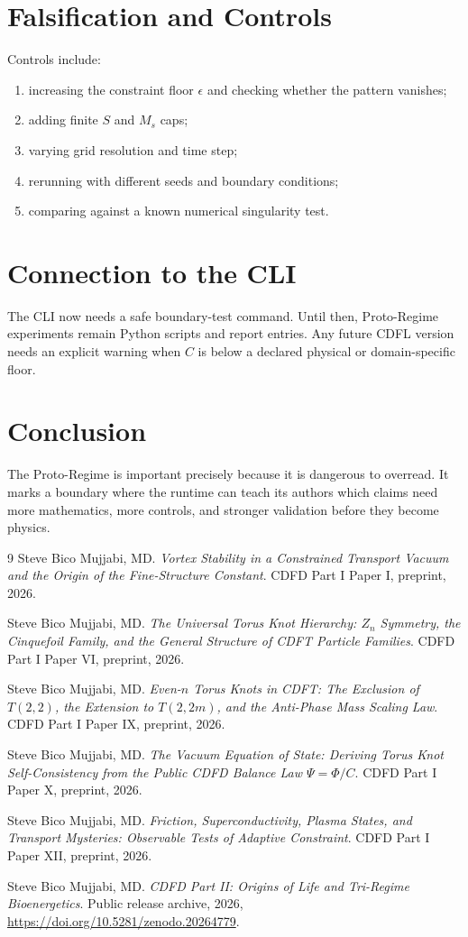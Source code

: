 \documentclass[12pt,a4paper]{article}
\begin{document}
\section{Falsification and Controls}
Controls include:
\begin{enumerate}
    \item increasing the constraint floor $\epsilon$ and checking whether the
    pattern vanishes;
    \item adding finite $S$ and $M_s$ caps;
    \item varying grid resolution and time step;
    \item rerunning with different seeds and boundary conditions;
    \item comparing against a known numerical singularity test.
\end{enumerate}

\section{Connection to the CLI}
The CLI now needs a safe boundary-test command. Until then,
Proto-Regime experiments remain Python scripts and report entries. Any future
CDFL version needs an explicit warning when $C$ is below a declared
physical or domain-specific floor.

\section{Conclusion}
The Proto-Regime is important precisely because it is dangerous to overread.
It marks a boundary where the runtime can teach its authors which claims need
more mathematics, more controls, and stronger validation before they become
physics.
\begin{thebibliography}{9}
Steve Bico Mujjabi, MD. \emph{Vortex Stability in a Constrained Transport Vacuum and the Origin of the Fine-Structure Constant}. CDFD Part I Paper I, preprint, 2026.

Steve Bico Mujjabi, MD. \emph{The Universal Torus Knot Hierarchy: $Z_n$ Symmetry, the Cinquefoil Family, and the General Structure of CDFT Particle Families}. CDFD Part I Paper VI, preprint, 2026.

Steve Bico Mujjabi, MD. \emph{Even-$n$ Torus Knots in CDFT: The Exclusion of $T(2,2)$, the Extension to $T(2,2m)$, and the Anti-Phase Mass Scaling Law}. CDFD Part I Paper IX, preprint, 2026.

Steve Bico Mujjabi, MD. \emph{The Vacuum Equation of State: Deriving Torus Knot Self-Consistency from the Public CDFD Balance Law $\Psi = \Phi/C$}. CDFD Part I Paper X, preprint, 2026.

Steve Bico Mujjabi, MD. \emph{Friction, Superconductivity, Plasma States, and Transport Mysteries: Observable Tests of Adaptive Constraint}. CDFD Part I Paper XII, preprint, 2026.

Steve Bico Mujjabi, MD. \emph{CDFD Part II: Origins of Life and Tri-Regime Bioenergetics}. Public release archive, 2026, \url{https://doi.org/10.5281/zenodo.20264779}.
\end{thebibliography}
\end{document}
